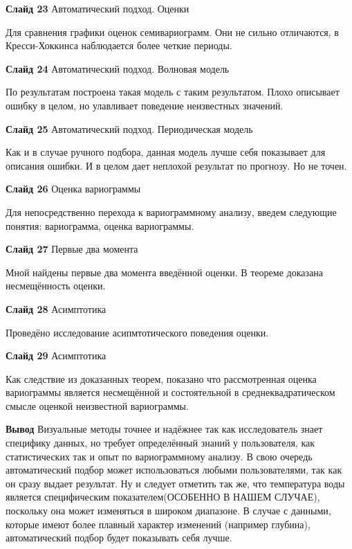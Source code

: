 \documentclass[a4paper,10pt]{report}
\begin{document}
\textbf{Слайд 23} Автоматический подход. Оценки

Для сравнения графики оценок семивариограмм. Они не сильно отличаются, в Кресси-Хоккинса наблюдается более четкие периоды.

\textbf{Слайд 24} Автоматический подход. Волновая модель

По результатам построена такая модель с таким результатом. Плохо описывает ошибку в целом, но улавливает поведение неизвестных значений.

\textbf{Слайд 25} Автоматический подход. Периодическая модель

Как и в случае ручного подбора, данная модель лучше себя показывает для описания ошибки. И в целом дает неплохой результат по прогнозу. Но не точен.

\textbf{Слайд 26} Оценка вариограммы

Для непосредственно перехода к вариограммному анализу, введем следующие понятия: вариограмма, оценка вариограммы.

\textbf{Слайд 27} Первые два момента

Мной найдены первые два момента введённой оценки. В теореме доказана несмещённость оценки.

\textbf{Слайд 28} Асимптотика

Проведёно исследование асипмтотического поведения оценки.

\textbf{Слайд 29} Асимптотика

Как следствие из доказанных теорем, показано что рассмотренная оценка вариограммы является несмещённой и состоятельной в среднеквадратическом смысле оценкой неизвестной вариограммы.

\textbf{Вывод} Визуальные методы точнее и надёжнее так как исследователь знает специфику данных, но требует определённый знаний у пользователя, как статистических так и опыт по вариограммному анализу. В свою очередь автоматический подбор может использоваться любыми пользователями, так как он сразу выдает результат. Ну и следует отметить так же, что температура воды является специфическим показателем(ОСОБЕННО В НАШЕМ СЛУЧАЕ), поскольку она может изменяться в широком диапазоне. В случае с данными, которые имеют более плавный характер изменений (например глубина), автоматический подбор будет показывать себя лучше.
\end{document}
